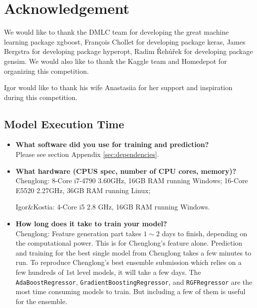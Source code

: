 \documentclass[12pt]{article}
\begin{document}
{{\section{Acknowledgement}
We would like to thank the DMLC team for developing the great machine learning package xgboost, Fran\c{c}ois Chollet for developing package keras, James Bergstra for developing package hyperopt, Radim {\v R}eh{\r u}{\v r}ek for developing package gensim. We would also like to thank the Kaggle team and Homedepot for organizing this competition.

Igor would like to thank his wife Anastasiia for her support and inspiration during this competition.














\begin{appendices}
\newpage

\section{Model Execution Time}

\begin{itemize}
\item \textbf{What software did you use for training and prediction?}\\
Please see section Appendix \ref{sec:dependencies}.

\item \textbf{What hardware (CPUS spec, number of CPU cores, memory)?}\\
Chenglong: 8-Core i7-4790 3.60GHz, 16GB RAM running Windows; 16-Core E5520 2.27GHz, 36GB RAM running Linux;

Igor\&Kostia: 4-Core i5 2.8 GHz, 16GB RAM running Windows.

\item \textbf{How long does it take to train your model?}\\
Chenglong: Feature generation part takes $1\sim 2$ days to finish, depending on the computational power. This is for Chenglong's feature alone. Prediction and training for the best single model from Chenglong takes a few minutes to run. To reproduce Chenglong's best ensemble submission which relies on a few hundreds of 1st level models, it will take a few days. The \texttt{AdaBoostRegressor}, \texttt{GradientBoostingRegressor}, and \texttt{RGFRegressor} are the most time consuming models to train. But including a few of them is useful for the ensemble.


\end{itemize}
\end{appendices}}}
\end{document}
